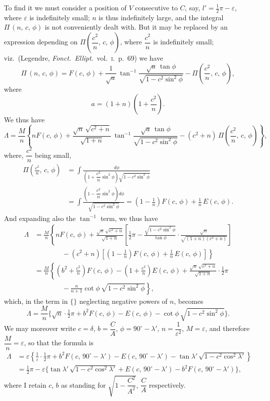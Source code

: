 \documentclass[11pt,a4paper]{article}
\begin{document}
To find it we must consider a position of $V$ consecutive to $C$, say,
$l' = \tfrac{1}{2}\pi - \varepsilon$, where $\varepsilon$ is indefinitely small;
$n$ is thus indefinitely large, and the integral $\Pi\,(n,\,c,\,\phi)$ is not
conveniently dealt with.  But it may be replaced by an expression depending on
$\Pi\!\left(\dfrac{c^2}{n},\,c,\,\phi\right)$, where $\dfrac{c^2}{n}$ is
indefinitely small; viz.\ (Legendre, \textit{Fonct.\ Ellipt.}\ vol.~\textsc{i}.\
p.~69) we have
\[
\Pi\,(n,\,c,\,\phi) = F(c,\,\phi)
+ \frac{1}{\sqrt{a}}\,\tan^{-1}\!\frac{\sqrt{a}\,\tan\phi}{\sqrt{1 - c^2\sin^2\phi}}
- \Pi\!\left(\frac{c^2}{n},\,c,\,\phi\right),
\]
where
\[
a = (1 + n)\left(1 + \frac{c^2}{n}\right).
\]
We thus have
\[
\Lambda = \frac{M}{n}\left\{n F(c,\,\phi)
+ \frac{\sqrt{n}\,\sqrt{c^2 + n}}{\sqrt{1 + n}}\,
\tan^{-1}\!\frac{\sqrt{a}\,\tan\phi}{\sqrt{1 - c^2\sin^2\phi}}
- (c^2 + n)\,\Pi\!\left(\frac{c^2}{n},\,c,\,\phi\right)\right\},
\]
where, $\dfrac{c^2}{n}$ being small,
\begin{align*}
\Pi\!\left(\frac{c^2}{n},\,c,\,\phi\right)
&= \int\!\frac{d\phi}
   {\left(1 + \dfrac{c^2}{n}\sin^2\phi\right)\sqrt{1 - c^2\sin^2\phi}} \\
&= \int\!\frac{\left(1 - \dfrac{c^2}{n}\sin^2\phi\right)d\phi}{\sqrt{1 - c^2\sin^2\phi}}
 = \left(1 - \frac{1}{n}\right)F(c,\,\phi) + \frac{1}{n}\,E(c,\,\phi).
\end{align*}
And expanding also the $\tan^{-1}$ term, we thus have
\begin{align*}
\Lambda
&= \frac{M}{n}\left\{n F(c,\,\phi)
+ \frac{\sqrt{n}\,\sqrt{c^2 + n}}{\sqrt{1 + n}}
\left[\tfrac{1}{2}\pi - \frac{\sqrt{1 - c^2\sin^2\phi}}{\tan\phi}\cdot
\frac{\sqrt{n}}{\sqrt{(1 + n)(c^2 + n)}}\right]\right. \\
&\qquad\qquad\left.{}
- (c^2 + n)\left[\left(1 - \frac{1}{n}\right)F(c,\,\phi) + \frac{1}{n}\,E(c,\,\phi)\right]\right\} \\
&= \frac{M}{n}\left\{\left(b^2 + \frac{c^2}{n}\right)F(c,\,\phi)
- \left(1 + \frac{c^2}{n}\right)E(c,\,\phi)
+ \frac{\sqrt{n}\,\sqrt{c^2 + n}}{\sqrt{1 + n}}\cdot\tfrac{1}{2}\pi\right. \\
&\qquad\qquad\left.{} - \frac{n}{n + 1}\cot\phi\,\sqrt{1 - c^2\sin^2\phi}\right\},
\end{align*}
which, in the term in $\{\}$ neglecting negative powers of $n$, becomes
\[
\Lambda = \frac{M}{n}\bigl\{\sqrt{n}\cdot\tfrac{1}{2}\pi
+ b^2 F(c,\,\phi) - E(c,\,\phi) - \cot\phi\,\sqrt{1 - c^2\sin^2\phi}\bigr\}.
\]
We may moreover write $c = \delta$, $b = \dfrac{C}{A}$,
$\phi = 90^\circ - \lambda'$, $n = \dfrac{1}{\varepsilon^2}$, $M = \varepsilon$,
and therefore $\dfrac{M}{n} = \varepsilon$, so that the formula is
\begin{align*}
\Lambda &= \varepsilon\left\{\frac{1}{\varepsilon}\cdot\tfrac{1}{2}\pi
+ b^2 F(c,\,90^\circ - \lambda') - E(c,\,90^\circ - \lambda')
- \tan\lambda'\,\sqrt{1 - c^2\cos^2\lambda'}\right\} \\
&= \tfrac{1}{2}\pi - \varepsilon\bigl\{\tan\lambda'\,\sqrt{1 - c^2\cos^2\lambda'}
+ E(c,\,90^\circ - \lambda') - b^2 F(c,\,90^\circ - \lambda')\bigr\},
\end{align*}
where I retain $c$, $b$ as standing for $\sqrt{1 - \dfrac{C^2}{A^2}}$,
$\dfrac{C}{A}$ respectively.
\end{document}
